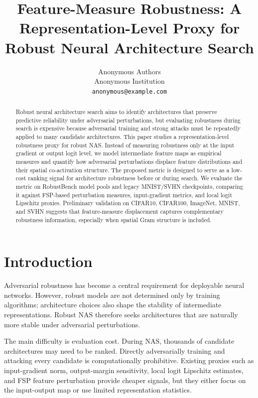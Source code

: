 \documentclass[10pt,twocolumn]{article}
\title{Feature-Measure Robustness: A Representation-Level Proxy for Robust Neural Architecture Search}
\author{
  Anonymous Authors\\
  Anonymous Institution\\
  \texttt{anonymous@example.com}
}
\date{}
\begin{document}
\maketitle

\begin{abstract}
Robust neural architecture search aims to identify architectures that preserve predictive reliability under adversarial perturbations, but evaluating robustness during search is expensive because adversarial training and strong attacks must be repeatedly applied to many candidate architectures.
This paper studies a representation-level robustness proxy for robust NAS.
Instead of measuring robustness only at the input gradient or output logit level, we model intermediate feature maps as empirical measures and quantify how adversarial perturbations displace feature distributions and their spatial co-activation structure.
The proposed metric is designed to serve as a low-cost ranking signal for architecture robustness before or during search.
We evaluate the metric on RobustBench model pools and legacy MNIST/SVHN checkpoints, comparing it against FSP-based perturbation measures, input-gradient metrics, and local logit Lipschitz proxies.
Preliminary validation on CIFAR10, CIFAR100, ImageNet, MNIST, and SVHN suggests that feature-measure displacement captures complementary robustness information, especially when spatial Gram structure is included.
\end{abstract}

\section{Introduction}

Adversarial robustness has become a central requirement for deployable neural networks.
However, robust models are not determined only by training algorithms; architecture choices also shape the stability of intermediate representations.
Robust NAS therefore seeks architectures that are naturally more stable under adversarial perturbations.

The main difficulty is evaluation cost.
During NAS, thousands of candidate architectures may need to be ranked.
Directly adversarially training and attacking every candidate is computationally prohibitive.
Existing proxies such as input-gradient norm, output-margin sensitivity, local logit Lipschitz estimates, and FSP feature perturbation provide cheaper signals, but they either focus on the input-output map or use limited representation statistics.
\end{document}
